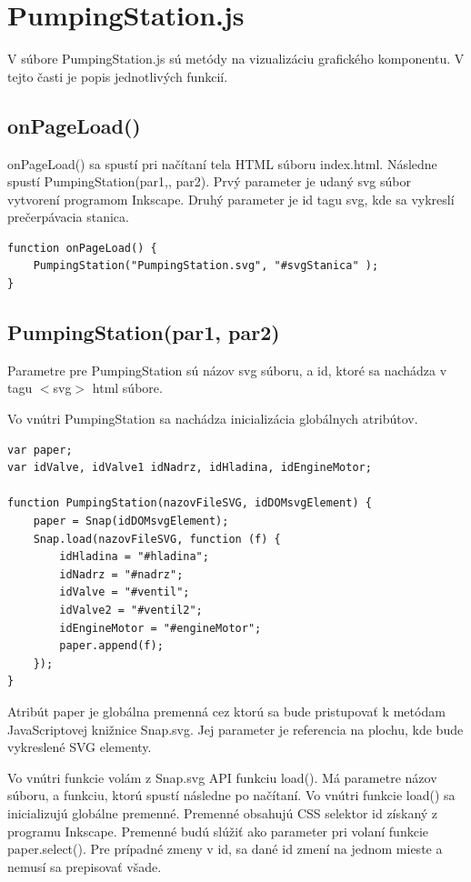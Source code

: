 \section{PumpingStation.js}
V súbore PumpingStation.js sú metódy na vizualizáciu grafického komponentu. V tejto časti je popis jednotlivých funkcií. 

\subsection{onPageLoad()}
onPageLoad() sa spustí pri načítaní tela HTML súboru index.html. Následne spustí  PumpingStation(par1,, par2). Prvý parameter je udaný svg súbor vytvorení programom Inkscape. Druhý parameter je id tagu svg, kde sa vykreslí prečerpávacia stanica.

\begin{lstlisting}
function onPageLoad() {
	PumpingStation("PumpingStation.svg", "#svgStanica" );
}
\end{lstlisting}

\subsection{PumpingStation(par1, par2)}

Parametre pre PumpingStation sú názov svg súboru, a id, ktoré sa nachádza v tagu $<$svg$>$ html súbore.

Vo vnútri PumpingStation sa nachádza inicializácia globálnych atribútov. 
\begin{lstlisting}
var paper;
var idValve, idValve1 idNadrz, idHladina, idEngineMotor;

function PumpingStation(nazovFileSVG, idDOMsvgElement) {
	paper = Snap(idDOMsvgElement);
	Snap.load(nazovFileSVG, function (f) {
		idHladina = "#hladina";
		idNadrz = "#nadrz";
		idValve = "#ventil";
		idValve2 = "#ventil2";
		idEngineMotor = "#engineMotor";
		paper.append(f);
	});
}
\end{lstlisting}

Atribút paper je globálna premenná cez ktorú sa bude pristupovať k metódam JavaScriptovej knižnice Snap.svg. Jej parameter je referencia na plochu, kde bude vykreslené SVG elementy.

Vo vnútri funkcie volám z Snap.svg API funkciu load(). Má parametre názov súboru, a funkciu, ktorú spustí následne po načítaní. 
Vo vnútri funkcie load() sa inicializujú globálne premenné.  
Premenné obsahujú CSS selektor id získaný z programu Inkscape. Premenné budú slúžiť ako parameter pri volaní funkcie paper.select(). Pre prípadné zmeny v id, sa dané id zmení na jednom mieste a nemusí sa prepisovať všade. 

